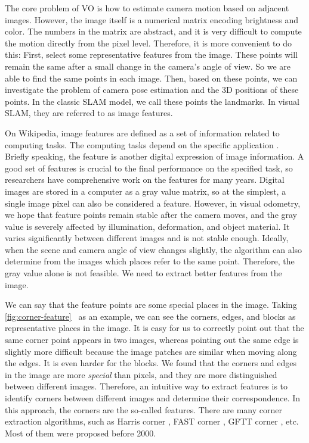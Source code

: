 The core problem of VO is how to estimate camera motion based on adjacent images. However, the image itself is a numerical matrix encoding brightness and color. The numbers in the matrix are abstract, and it is very difficult to compute the motion directly from the pixel level. Therefore, it is more convenient to do this: First, select some representative features from the image. These points will remain the same after a small change in the camera's angle of view. So we are able to find the same points in each image. Then, based on these points, we can investigate the problem of camera pose estimation and the 3D positions of these points. In the classic SLAM model, we call these points the landmarks. In visual SLAM, they are referred to as image features.

On Wikipedia, image features are defined as a set of information related to computing tasks. The computing tasks depend on the specific application {\cite{wiki:featurecv}}. Briefly speaking, the feature is another digital expression of image information. A good set of features is crucial to the final performance on the specified task, so researchers have comprehensive work on the features for many years. Digital images are stored in a computer as a gray value matrix, so at the simplest, a single image pixel can also be considered a feature. However, in visual odometry, we hope that feature points remain stable after the camera moves, and the gray value is severely affected by illumination, deformation, and object material. It varies significantly between different images and is not stable enough. Ideally, when the scene and camera angle of view changes slightly, the algorithm can also determine from the images which places refer to the same point. Therefore, the gray value alone is not feasible. We need to extract better features from the image.

We can say that the feature points are some special places in the image. Taking \autoref{fig:corner-feature}~ as an example, we can see the corners, edges, and blocks as representative places in the image. It is easy for us to correctly point out that the same corner point appears in two images, whereas pointing out the same edge is slightly more difficult because the image patches are similar when moving along the edges. It is even harder for the blocks. We found that the corners and edges in the image are more \textit{special} than pixels, and they are more distinguished between different images. Therefore, an intuitive way to extract features is to identify corners between different images and determine their correspondence. In this approach, the corners are the so-called features. There are many corner extraction algorithms, such as Harris corner {\cite{Harris1988}}, FAST corner {\cite{Rosten2006}}, GFTT corner  {\cite{Shi1994}}, etc. Most of them were proposed before 2000.

